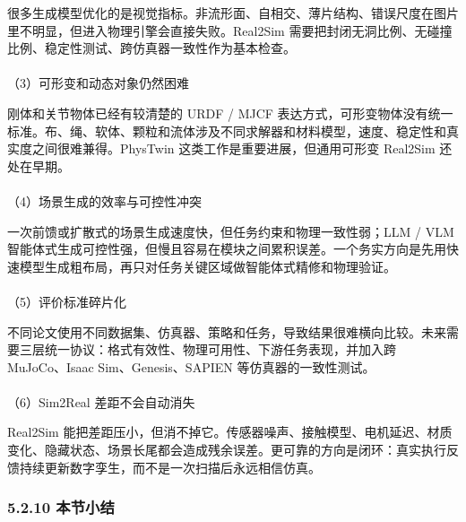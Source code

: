 \documentclass[
  chinese,
]{ctexart}
\makeatletter
\let\oldparagraph\paragraph
\renewcommand{\paragraph}{
    \@ifstar
      \xxxParagraphStar
      \xxxParagraphNoStar
  }
\newcommand{\xxxParagraphStar}[1]{\oldparagraph*{#1}\mbox{}}
\newcommand{\xxxParagraphNoStar}[1]{\oldparagraph{#1}\mbox{}}
\makeatother
\begin{document}
很多生成模型优化的是视觉指标。非流形面、自相交、薄片结构、错误尺度在图片里不明显，但进入物理引擎会直接失败。Real2Sim
需要把封闭无洞比例、无碰撞比例、稳定性测试、跨仿真器一致性作为基本检查。

\paragraph{（3）可形变和动态对象仍然困难}\label{ux53efux5f62ux53d8ux548cux52a8ux6001ux5bf9ux8c61ux4ecdux7136ux56f0ux96be}

刚体和关节物体已经有较清楚的 URDF / MJCF
表达方式，可形变物体没有统一标准。布、绳、软体、颗粒和流体涉及不同求解器和材料模型，速度、稳定性和真实度之间很难兼得。PhysTwin
这类工作是重要进展，但通用可形变 Real2Sim 还处在早期。

\paragraph{（4）场景生成的效率与可控性冲突}\label{ux573aux666fux751fux6210ux7684ux6548ux7387ux4e0eux53efux63a7ux6027ux51b2ux7a81}

一次前馈或扩散式的场景生成速度快，但任务约束和物理一致性弱；LLM / VLM
智能体式生成可控性强，但慢且容易在模块之间累积误差。一个务实方向是先用快速模型生成粗布局，再只对任务关键区域做智能体式精修和物理验证。

\paragraph{（5）评价标准碎片化}\label{ux8bc4ux4ef7ux6807ux51c6ux788eux7247ux5316}

不同论文使用不同数据集、仿真器、策略和任务，导致结果很难横向比较。未来需要三层统一协议：格式有效性、物理可用性、下游任务表现，并加入跨
MuJoCo、Isaac Sim、Genesis、SAPIEN 等仿真器的一致性测试。

\paragraph{（6）Sim2Real
差距不会自动消失}\label{sim2real-ux5deeux8dddux4e0dux4f1aux81eaux52a8ux6d88ux5931}

Real2Sim
能把差距压小，但消不掉它。传感器噪声、接触模型、电机延迟、材质变化、隐藏状态、场景长尾都会造成残余误差。更可靠的方向是闭环：真实执行反馈持续更新数字孪生，而不是一次扫描后永远相信仿真。

\subsubsection{5.2.10 本节小结}\label{ux672cux8282ux5c0fux7ed3-4}
\end{document}
